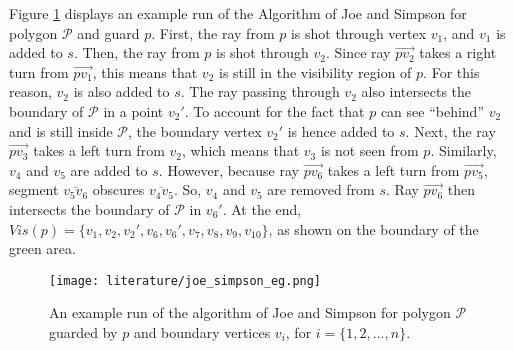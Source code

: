 Figure \ref{fig:joe} displays an example run of the Algorithm of Joe and Simpson \cite{joe1987corrections} for polygon $\mathcal P$ and guard $p$. First, the ray from $p$ is shot through vertex $v_1$, and $v_1$ is added to $s$. Then, the ray from $p$ is shot through $v_2$. Since ray $\vec{pv_2}$ takes a right turn from $\vec{pv_1}$, this means that $v_2$ is still in the visibility region of $p$. For this reason, $v_2$ is also added to $s$. The ray passing through $v_2$ also intersects the boundary of $\mathcal P$ in a point $v_2'$. To account for the fact that $p$ can see ``behind'' $v_2$ and is still inside $\mathcal P$, the boundary vertex $v_2'$ is hence added to $s$. Next, the ray $\vec{pv_3}$ takes a left turn from $v_2$, which means that $v_3$ is not seen from $p$. Similarly, $v_4$ and $v_5$ are added to $s$. However, because ray $\vec{pv_6}$ takes a left turn from $\vec{pv_5}$, segment $\overline{v_5v_6}$ obscures $\overline{v_4v_5}$. So, $v_4$ and $v_5$ are removed from $s$. Ray $\vec{pv_6}$ then intersects the boundary of $\mathcal P$ in $v_6'$. At the end, $Vis(p) = \{v_1, v_2, v_2', v_6, v_6', v_7, v_8, v_9, v_{10}\}$, as shown on the boundary of the green area. 

\begin{figure}[h!]
	\centering
	\texttt{[image: literature/joe\_simpson\_eg.png]}
	\caption{An example run of the algorithm of Joe and Simpson \cite{joe1987corrections} for polygon $\mathcal P$ guarded by $p$ and boundary vertices $v_i$, for $i = \{1, 2, ..., n\}$.}
	\label{fig:joe}
\end{figure}



